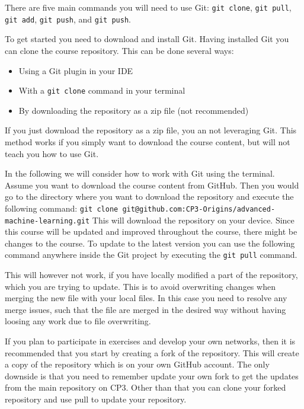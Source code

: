 \documentclass[12pt,a4paper]{article} %
\numberwithin{equation}{section}
\begin{document}
		There are five main commands you will need to use Git: \texttt{git clone}, \texttt{git pull}, \texttt{git add}, \texttt{git push}, and \texttt{git push}.
		
		To get started you need to download and install Git. Having installed Git you can clone the course repository. This can be done several ways:
		\begin{itemize}
			\item Using a Git plugin in your IDE
			\item With a \texttt{git clone} command in your terminal
			\item By downloading the repository as a zip file (not recommended)
		\end{itemize}
		If you just download the repository as a zip file, you an not leveraging Git. This method works if you simply want to download the course content, but will not teach you how to use Git.
		
		In the following we will consider how to work with Git using the terminal. Assume you want to download the course content from GitHub. Then you would go to the directory where you want to download the repository and execute the following command:\newline \newline
		\texttt{git clone git@github.com:CP3-Origins/advanced-machine-learning.git}
		\newline  \newline
		This will download the repository on your device. Since this course will be updated and improved throughout the course, there might be changes to the course. To update to the latest version you can use the following command anywhere inside the Git project by executing the \texttt{git pull} command.

		This will however not work, if you have locally modified a part of the repository, which you are trying to update. This is to avoid overwriting changes when merging the new file with your local files. In this case you need to resolve any merge issues, such that the file are merged in the desired way without having loosing any work due to file overwriting.
		
		If you plan to participate in exercises and develop your own networks, then it is recommended that you start by creating a fork of the repository. This will create a copy of the repository which is on your own GitHub account. The only downside is that you need to remember update your own fork to get the updates from the main repository on CP3. Other than that you can clone your forked repository and use pull to update your repository.
		
\end{document}
